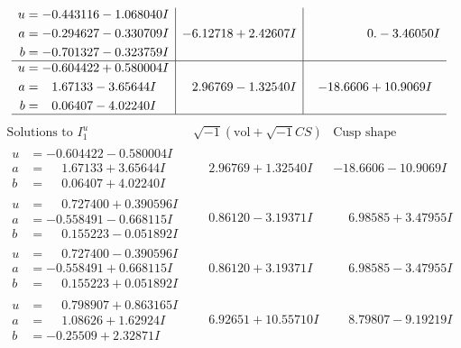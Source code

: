\documentclass[1p]{elsarticle_modified}
\theoremstyle{definition}
\newcommand{\I}{\sqrt{-1}}
\begin{document}
$$\begin{array}{c|c|c}
\begin{aligned}
u &= -0.443116 - 1.068040 I \\
a &= -0.294627 - 0.330709 I \\
b &= -0.701327 - 0.323759 I\end{aligned}
 & -6.12718 + 2.42607 I & \phantom{-0.000000 } 0. - 3.46050 I \\ \hline\begin{aligned}
u &= -0.604422 + 0.580004 I \\
a &= \phantom{-}1.67133 - 3.65644 I \\
b &= \phantom{-}0.06407 - 4.02240 I\end{aligned}
 & \phantom{-}2.96769 - 1.32540 I & -18.6606 + 10.9069 I\\
 \hline 
 \end{array}$$\newpage$$\begin{array}{c|c|c}  
\text{Solutions to }I^u_{1}& \I (\text{vol} + \sqrt{-1}CS) & \text{Cusp shape}\\
 \hline 
\begin{aligned}
u &= -0.604422 - 0.580004 I \\
a &= \phantom{-}1.67133 + 3.65644 I \\
b &= \phantom{-}0.06407 + 4.02240 I\end{aligned}
 & \phantom{-}2.96769 + 1.32540 I & -18.6606 - 10.9069 I \\ \hline\begin{aligned}
u &= \phantom{-}0.727400 + 0.390596 I \\
a &= -0.558491 - 0.668115 I \\
b &= \phantom{-}0.155223 - 0.051892 I\end{aligned}
 & \phantom{-}0.86120 - 3.19371 I & \phantom{-}6.98585 + 3.47955 I \\ \hline\begin{aligned}
u &= \phantom{-}0.727400 - 0.390596 I \\
a &= -0.558491 + 0.668115 I \\
b &= \phantom{-}0.155223 + 0.051892 I\end{aligned}
 & \phantom{-}0.86120 + 3.19371 I & \phantom{-}6.98585 - 3.47955 I \\ \hline\begin{aligned}
u &= \phantom{-}0.798907 + 0.863165 I \\
a &= \phantom{-}1.08626 + 1.62924 I \\
b &= -0.25509 + 2.32871 I\end{aligned}
 & \phantom{-}6.92651 + 10.55710 I & \phantom{-}8.79807 - 9.19219 I \\ \hline\begin{aligned}

\end{aligned}
\end{array}$$
\end{document}
